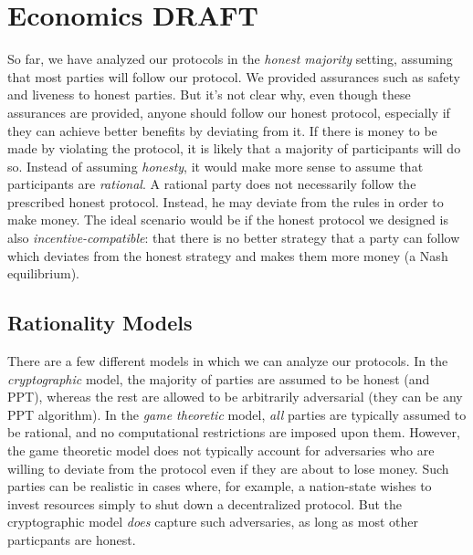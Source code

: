 \chapter{Economics \small{\textsf{DRAFT}}}\label{chapter:economics}

So far, we have analyzed our protocols in the \emph{honest majority} setting,
assuming that most parties will follow our protocol. We provided assurances
such as safety and liveness to honest parties. But it's not clear why,
even though these assurances are provided, anyone should follow our honest
protocol, especially if they can achieve better benefits by deviating from
it. If there is money to be made by violating the protocol, it is likely that
a majority of participants will do so. Instead of assuming \emph{honesty},
it would make more sense to assume that participants are \emph{rational}.
A rational party does not necessarily follow the prescribed honest protocol.
Instead, he may deviate from the rules in order to make money.
The ideal scenario would be if the honest protocol we designed is also
\emph{incentive-compatible}:
that there is no better strategy that
a party can follow which deviates from the honest strategy and makes them
more money (a Nash equilibrium).

\section{Rationality Models}

There are a few different models in which we can analyze our protocols.
In the \emph{cryptographic} model, the majority of parties are assumed
to be honest (and PPT), whereas the rest are allowed to be arbitrarily
adversarial (they can be any PPT algorithm). In the \emph{game theoretic}
model, \emph{all} parties are typically assumed to be rational, and
no computational restrictions are imposed upon them. However, the game
theoretic model does not typically account for adversaries who are willing
to deviate from the protocol even if they are about to lose money. Such
parties can be realistic in cases where, for example, a nation-state
wishes to invest resources simply to shut down a decentralized protocol.
But the cryptographic model \emph{does} capture such adversaries, as
long as most other particpants are honest.

